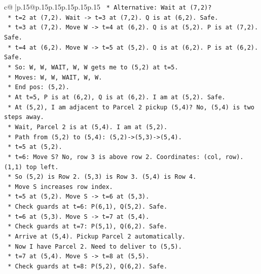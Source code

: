 \documentclass{article}
\begin{document}
{\begin{supertabular}{c@{$\;$}|p{.15\linewidth}@{}p{.15\linewidth}p{.15\linewidth}p{.15\linewidth}p{.15\linewidth}p{.15\linewidth}}
{{{\texttt{        *   Alternative: Wait at (7,2)?} \\
\texttt{            *   t=2 at (7,2). Wait {-}> t=3 at (7,2). Q is at (6,2). Safe.} \\
\texttt{            *   t=3 at (7,2). Move W {-}> t=4 at (6,2). Q is at (5,2). P is at (7,2). Safe.} \\
\texttt{            *   t=4 at (6,2). Move W {-}> t=5 at (5,2). Q is at (6,2). P is at (6,2). Safe.} \\
\texttt{            *   So: W, W, WAIT, W, W gets me to (5,2) at t=5.} \\
\texttt{            *   Moves: W, W, WAIT, W, W.} \\
\texttt{            *   End pos: (5,2).} \\
\texttt{            *   At t=5, P is at (6,2), Q is at (6,2). I am at (5,2). Safe.} \\
\texttt{            *   At (5,2), I am adjacent to Parcel 2 pickup (5,4)? No, (5,4) is two steps away.} \\
\texttt{            *   Wait, Parcel 2 is at (5,4). I am at (5,2).} \\
\texttt{            *   Path from (5,2) to (5,4): (5,2){-}>(5,3){-}>(5,4).} \\
\texttt{            *   t=5 at (5,2).} \\
\texttt{            *   t=6: Move S? No, row 3 is above row 2. Coordinates: (col, row). (1,1) top left.} \\
\texttt{            *   So (5,2) is Row 2. (5,3) is Row 3. (5,4) is Row 4.} \\
\texttt{            *   Move S increases row index.} \\
\texttt{            *   t=5 at (5,2). Move S {-}> t=6 at (5,3).} \\
\texttt{                *   Check guards at t=6: P(6,1), Q(5,2). Safe.} \\
\texttt{            *   t=6 at (5,3). Move S {-}> t=7 at (5,4).} \\
\texttt{                *   Check guards at t=7: P(5,1), Q(6,2). Safe.} \\
\texttt{                *   Arrive at (5,4). Pickup Parcel 2 automatically.} \\
\texttt{            *   Now I have Parcel 2. Need to deliver to (5,5).} \\
\texttt{            *   t=7 at (5,4). Move S {-}> t=8 at (5,5).} \\
\texttt{                *   Check guards at t=8: P(5,2), Q(6,2). Safe.} \\
}}}
\end{supertabular}}
\end{document}
